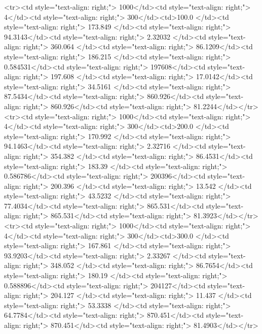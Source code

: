 <tr><td style="text-align: right;">      1000</td><td style="text-align: right;">         4</td><td style="text-align: right;">           300</td><td>100.0        </td><td style="text-align: right;">               173.849 </td><td style="text-align: right;">            94.3143</td><td style="text-align: right;">         2.32032 </td><td style="text-align: right;">        360.064 </td><td style="text-align: right;">            86.1209</td><td style="text-align: right;">             186.215   </td><td style="text-align: right;">             0.584531</td><td style="text-align: right;">              197608</td><td style="text-align: right;">                      197.608 </td><td style="text-align: right;">            17.0142</td><td style="text-align: right;">                34.5161 </td><td style="text-align: right;">        87.5434</td><td style="text-align: right;">    860.926</td><td style="text-align: right;">       860.926</td><td style="text-align: right;">                 81.2244</td></tr>
<tr><td style="text-align: right;">      1000</td><td style="text-align: right;">         4</td><td style="text-align: right;">           300</td><td>200.0        </td><td style="text-align: right;">               170.992 </td><td style="text-align: right;">            94.1463</td><td style="text-align: right;">         2.32716 </td><td style="text-align: right;">        354.382 </td><td style="text-align: right;">            86.4531</td><td style="text-align: right;">             183.39    </td><td style="text-align: right;">             0.586786</td><td style="text-align: right;">              200396</td><td style="text-align: right;">                      200.396 </td><td style="text-align: right;">            13.542 </td><td style="text-align: right;">                43.5232 </td><td style="text-align: right;">        77.4034</td><td style="text-align: right;">    865.531</td><td style="text-align: right;">       865.531</td><td style="text-align: right;">                 81.3923</td></tr>
<tr><td style="text-align: right;">      1000</td><td style="text-align: right;">         4</td><td style="text-align: right;">           300</td><td>300.0        </td><td style="text-align: right;">               167.861 </td><td style="text-align: right;">            93.9203</td><td style="text-align: right;">         2.33267 </td><td style="text-align: right;">        348.052 </td><td style="text-align: right;">            86.7654</td><td style="text-align: right;">             180.19    </td><td style="text-align: right;">             0.588896</td><td style="text-align: right;">              204127</td><td style="text-align: right;">                      204.127 </td><td style="text-align: right;">            11.437 </td><td style="text-align: right;">                53.3338 </td><td style="text-align: right;">        64.7784</td><td style="text-align: right;">    870.451</td><td style="text-align: right;">       870.451</td><td style="text-align: right;">                 81.4903</td></tr>
